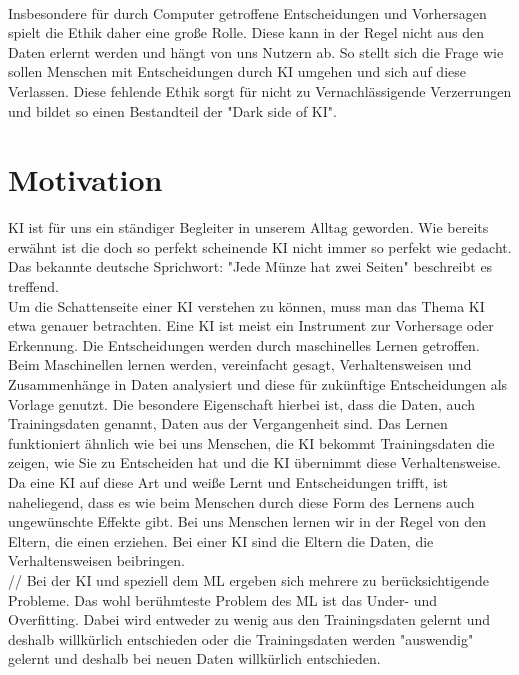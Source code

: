 \begin{onehalfspace}
        \\
        Insbesondere für durch Computer getroffene Entscheidungen und Vorhersagen spielt die Ethik daher eine große Rolle. Diese kann in der Regel nicht aus den Daten erlernt werden und hängt von uns Nutzern ab. So stellt sich die Frage wie sollen Menschen mit Entscheidungen durch \ac*{KI} umgehen und sich auf diese Verlassen. Diese fehlende Ethik sorgt für nicht zu Vernachlässigende Verzerrungen und bildet so einen Bestandteil der "Dark side of \ac*{KI}".

        \newpage
        \section{Motivation}
        \label{subsec:motivation}
        \ac*{KI} ist für uns ein ständiger Begleiter in unserem Alltag geworden. Wie bereits erwähnt ist die doch so perfekt scheinende \ac*{KI} nicht immer so perfekt wie gedacht. Das bekannte deutsche Sprichwort: "Jede Münze hat zwei Seiten" beschreibt es treffend.
        \\
         Um die Schattenseite einer \ac*{KI} verstehen zu können, muss man das Thema \ac*{KI} etwa genauer betrachten. Eine \ac*{KI} ist meist ein Instrument zur Vorhersage oder Erkennung. Die Entscheidungen werden durch maschinelles Lernen getroffen. Beim Maschinellen lernen werden, vereinfacht gesagt, Verhaltensweisen und Zusammenhänge in Daten analysiert und diese für zukünftige Entscheidungen als Vorlage genutzt. Die besondere Eigenschaft hierbei ist, dass die Daten, auch Trainingsdaten genannt, Daten aus der Vergangenheit sind. Das Lernen funktioniert ähnlich wie bei uns Menschen, die \ac*{KI} bekommt Trainingsdaten die zeigen, wie Sie zu Entscheiden hat und die \ac*{KI} übernimmt diese Verhaltensweise. Da eine \ac*{KI} auf diese Art und weiße Lernt und Entscheidungen trifft, ist naheliegend, dass es wie beim Menschen durch diese Form des Lernens auch ungewünschte Effekte gibt. Bei uns Menschen lernen wir in der Regel von den Eltern, die einen erziehen. Bei einer \ac*{KI} sind die Eltern die Daten, die Verhaltensweisen beibringen. 
        \\//
        Bei der \ac*{KI} und speziell dem \ac*{ML} ergeben sich mehrere zu berücksichtigende Probleme. Das wohl berühmteste Problem des \ac*{ML} ist das Under- und Overfitting. Dabei wird entweder zu wenig aus den Trainingsdaten gelernt und deshalb willkürlich entschieden oder die Trainingsdaten werden "auswendig" gelernt und deshalb bei neuen Daten willkürlich entschieden. 
        \\

\end{onehalfspace}
